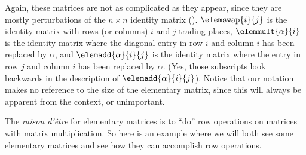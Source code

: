 %
Again, these matrices are not as complicated as they appear, since they are mostly perturbations of the $n\times n$ identity matrix ().  $\elemswap{i}{j}$ is the identity matrix with rows (or columns) $i$ and $j$ trading places, $\elemmult{\alpha}{i}$ is the identity matrix where the diagonal entry in row $i$ and column $i$ has been replaced by $\alpha$, and $\elemadd{\alpha}{i}{j}$ is the identity matrix where the entry in row $j$ and column $i$ has been replaced by $\alpha$. (Yes, those subscripts look backwards in the description of $\elemadd{\alpha}{i}{j}$).  Notice that our notation makes no reference to the size of the elementary matrix, since this will always be apparent from the context, or unimportant.\par
%
The {\it raison d'\^{e}tre} for elementary matrices is to ``do'' row operations on matrices with matrix multiplication.  So here is an example where we will both see some elementary matrices and see how they can accomplish row operations.
%
